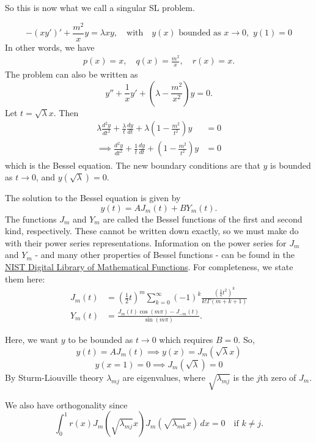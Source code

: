 So this is now what we call a singular SL problem.

\begin{eg}
	\[
	-\left(xy'\right)' + \frac{m^2}{x}y = \lambda xy, \quad\text{with}\quad y(x) \text{ bounded as } x \rightarrow 0, \,\, y(1) = 0
	\]
	In other words, we have
	\begin{align*}
		p(x) = x, \quad q(x) = \frac{m^2}{x}, \quad r(x) = x.
	\end{align*}
	The problem can also be written as 
	\[
	y'' + \frac{1}{x} y' + \left(\lambda - \frac{m^2}{x^2}\right)y = 0.
	\]
	Let $t= \sqrt{\lambda} x$. Then
	\begin{align}
		\lambda\frac{d^2y}{dt^2} + \frac{\lambda}{t} \frac{dy}{dt} + \lambda\left(1- \frac{m^2}{t^2}\right)y &= 0 \nonumber \\
		\label{eq:bessel}\implies \frac{d^2y}{dt^2} + \frac{1}{t} \frac{dy}{dt} + \left(1- \frac{m^2}{t^2}\right)y &= 0
	\end{align}
	which is the Bessel equation. The new boundary conditions are that $y$ is bounded as $t \to 0$, and $y(\sqrt{\lambda}) = 0$.
	
	The solution to the Bessel equation is given by
	\[
	y(t) = A J_m(t) + BY_m(t).
	\]
	The functions $J_m$ and $Y_m$ are called the Bessel functions of the first and second kind, respectively. These cannot be written down exactly, so we must make do with their power series representations. Information on the power series for $J_m$ and $Y_m$ - and many other properties of Bessel functions - can be found in the \href{https://dlmf.nist.gov/}{NIST Digital Library of Mathematical Functions}. For completeness, we state them here:
	\begin{align}
		\label{eq:besselfirstkind}
		J_m(t) &= (\tfrac12 t)^m \sum_{k=0}^{\infty} (-1)^k \frac{(\frac14 t^2)^k}{k!\Gamma(m+k+1)} \\
		Y_m(t) &= \frac{J_m(t)\cos(m\pi) - J_{-m}(t)}{\sin(m\pi)}.
	\end{align}
	
	Here, we want $y$ to be bounded as $t \rightarrow 0$ which requires $B=0$. So, 
	\[
	y(t) = A J_m(t) \implies y(x) = J_m(\sqrt{\lambda}x) 
	\]
	\[
	y(x=1) = 0 \implies J_m(\sqrt{\lambda}) = 0
	\]
	By Sturm-Liouville theory $\lambda_{mj}$ are eigenvalues, where $\sqrt{\lambda_{mj}}$ is the $j$th zero of $J_m$.
	
	We also have orthogonality since
	\[
	\int_0^1 r(x) J_m (\sqrt{\lambda_{mj}} x) J_m (\sqrt{\lambda_{mk}} x) \,dx = 0 \quad \text{if } k \neq j.
	\]
\end{eg}

